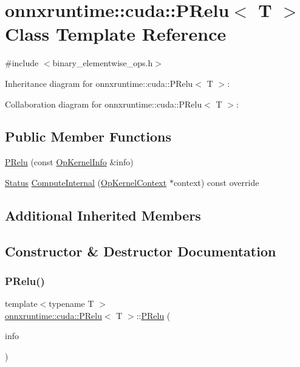 \hypertarget{classonnxruntime_1_1cuda_1_1PRelu}{}\section{onnxruntime\+:\+:cuda\+:\+:P\+Relu$<$ T $>$ Class Template Reference}
\label{classonnxruntime_1_1cuda_1_1PRelu}


{\ttfamily \#include $<$binary\+\_\+elementwise\+\_\+ops.\+h$>$}



Inheritance diagram for onnxruntime\+:\+:cuda\+:\+:P\+Relu$<$ T $>$\+:


Collaboration diagram for onnxruntime\+:\+:cuda\+:\+:P\+Relu$<$ T $>$\+:
\subsection*{Public Member Functions}
\begin{DoxyCompactItemize}
\item 
\mbox{\hyperlink{classonnxruntime_1_1cuda_1_1PRelu_af97b93e2f854fd51833f6cddb1fe7385}{P\+Relu}} (const \mbox{\hyperlink{classonnxruntime_1_1OpKernelInfo}{Op\+Kernel\+Info}} \&info)
\item 
\mbox{\hyperlink{classonnxruntime_1_1common_1_1Status}{Status}} \mbox{\hyperlink{classonnxruntime_1_1cuda_1_1PRelu_ac22e96f904703a1dd13dc6748a67f2ae}{Compute\+Internal}} (\mbox{\hyperlink{classonnxruntime_1_1OpKernelContext}{Op\+Kernel\+Context}} $\ast$context) const override
\end{DoxyCompactItemize}
\subsection*{Additional Inherited Members}


\subsection{Constructor \& Destructor Documentation}
\mbox{\label{classonnxruntime_1_1cuda_1_1PRelu_af97b93e2f854fd51833f6cddb1fe7385}} 
\subsubsection{\texorpdfstring{P\+Relu()}{PRelu()}}
{\footnotesize\ttfamily template$<$typename T $>$ \\
\mbox{\hyperlink{classonnxruntime_1_1cuda_1_1PRelu}{onnxruntime\+::cuda\+::\+P\+Relu}}$<$ T $>$\+::\mbox{\hyperlink{classonnxruntime_1_1cuda_1_1PRelu}{P\+Relu}} (\begin{DoxyParamCaption}\item[{const \mbox{\hyperlink{classonnxruntime_1_1OpKernelInfo}{Op\+Kernel\+Info}} \&}]{info }\end{DoxyParamCaption})\hspace{0.3cm}{\ttfamily [inline]}}



